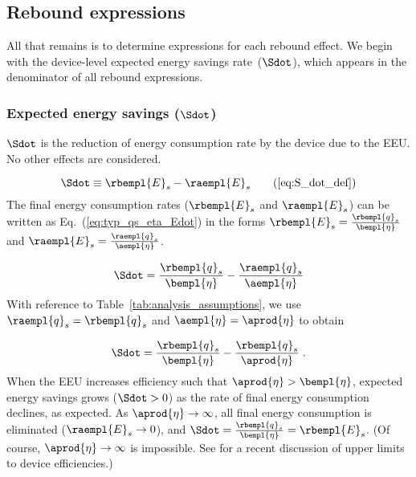 












\subsection{Rebound expressions}
\label{sec:rebound_expressions}

All that remains is to determine expressions for each rebound effect.
We begin with the device-level expected energy savings rate~($\Sdot$), which
appears in the denominator of all rebound expressions.


\subsubsection{Expected energy savings ($\Sdot$)} 
\label{sec:Sdot}

$\Sdot$ is the reduction of energy consumption rate
by the device due to the EEU.
No other effects are considered.

\begin{equation}
  \Sdot \equiv \rbempl{E}_s - \raempl{E}_s  \tag{\ref{eq:S_dot_def}}
\end{equation}
%
The final energy consumption rates ($\rbempl{E}_s$ and $\raempl{E}_s$) 
can be written as Eq.~(\ref{eq:typ_qs_eta_Edot}) in the forms
$\rbempl{E}_s = \frac{\rbempl{q}_s}{\bempl{\eta}}$ and 
$\raempl{E}_s = \frac{\raempl{q}_s}{\aempl{\eta}}$. 

\begin{equation}
  \Sdot = \frac{\rbempl{q}_s}{\bempl{\eta}} - \frac{\raempl{q}_s}{\aempl{\eta}}
\end{equation}
%
With reference to Table~\ref{tab:analysis_assumptions}, 
we use $\raempl{q}_s = \rbempl{q}_s$ and $\aempl{\eta} = \aprod{\eta}$ to obtain

\begin{equation}
  \Sdot = \frac{\rbempl{q}_s}{\bempl{\eta}} - \frac{\rbempl{q}_s}{\aprod{\eta}} \; .
\end{equation}
%
When the EEU increases efficiency such that $\aprod{\eta} > \bempl{\eta}$,
expected energy savings grows ($\Sdot > 0$)
as the rate of final energy consumption declines,
as expected.
As $\aprod{\eta} \rightarrow \infty$,
all final energy consumption is eliminated ($\raempl{E}_s \rightarrow 0$), and
$\Sdot = \frac{\rbempl{q}_s}{\bempl{\eta}} = \rbempl{E}_s$.
(Of course, $\aprod{\eta} \rightarrow \infty$ is impossible. 
See \citet{Paoli:2020aa} for a recent discussion of upper limits to device efficiencies.)


